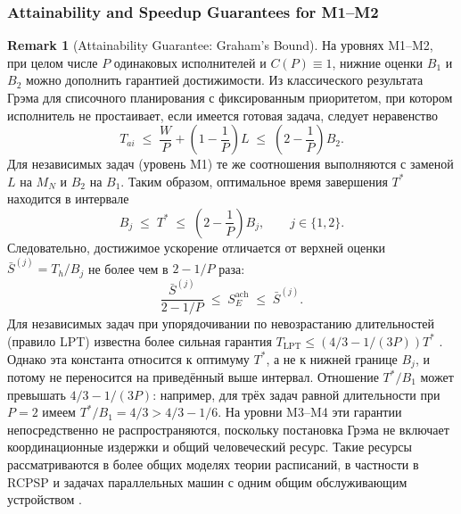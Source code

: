 \documentclass[12pt,a4paper]{article}
\theoremstyle{definition}
\newtheorem{remark}{Remark}
\begin{document}
\subsubsection{Attainability and Speedup Guarantees for M1--M2}

\begin{remark}[Attainability Guarantee: Graham's Bound]\label{rem:graham}
На уровнях M1--M2, при целом числе $P$ одинаковых исполнителей и $C(P) \equiv 1$, нижние оценки $B_1$ и $B_2$ можно дополнить гарантией достижимости. Из классического результата Грэма для списочного планирования с фиксированным приоритетом, при котором исполнитель не простаивает, если имеется готовая задача, следует неравенство \cite{graham1966bounds}
\[
  T_{ai} \;\le\; \frac{W}{P} + \left(1 - \frac{1}{P}\right) L \;\le\; \left(2 - \frac{1}{P}\right) B_2.
\]
Для независимых задач (уровень M1) те же соотношения выполняются с заменой $L$ на $M_N$ и $B_2$ на $B_1$. Таким образом, оптимальное время завершения $T^{*}$ находится в интервале
\[
  B_j \;\le\; T^{*} \;\le\; \left(2 - \frac{1}{P}\right) B_j, \qquad j \in \{1, 2\}.
\]
Следовательно, достижимое ускорение отличается от верхней оценки $\bar S^{(j)} = T_h/B_j$ не более чем в $2 - 1/P$ раза:
\[
  \frac{\bar S^{(j)}}{2 - 1/P} \;\le\; S_E^{\text{ach}} \;\le\; \bar S^{(j)}.
\]
Для независимых задач при упорядочивании по невозрастанию длительностей (правило LPT) известна более сильная гарантия $T_{\mathrm{LPT}} \le \left(4/3 - 1/(3P)\right) T^{*}$ \cite{graham1969bounds}. Однако эта константа относится к оптимуму $T^{*}$, а не к нижней границе $B_j$, и потому не переносится на приведённый выше интервал. Отношение $T^{*}/B_1$ может превышать $4/3 - 1/(3P)$: например, для трёх задач равной длительности при $P = 2$ имеем $T^{*}/B_1 = 4/3 > 4/3 - 1/6$. На уровни M3--M4 эти гарантии непосредственно не распространяются, поскольку постановка Грэма не включает координационные издержки и общий человеческий ресурс. Такие ресурсы рассматриваются в более общих моделях теории расписаний, в частности в RCPSP и задачах параллельных машин с одним общим обслуживающим устройством \cite{brucker1999resource,hall2000parallel,kravchenko1997parallel}.
\end{remark}
\end{document}
